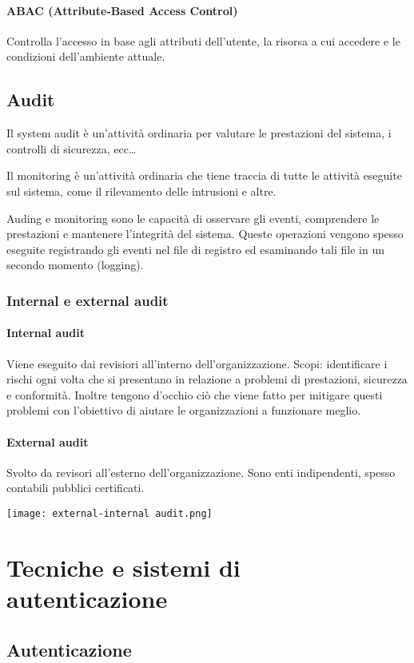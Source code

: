 \documentclass[11pt]{article}
\begin{document}
\paragraph*{ABAC (Attribute-Based Access Control)}
Controlla l'accesso in base agli attributi dell'utente, la risorsa a cui accedere e le condizioni dell'ambiente attuale.
\subsection{Audit}
Il system audit è un'attività ordinaria per valutare le prestazioni del sistema, i controlli di sicurezza, ecc\dots 

Il monitoring è un'attività ordinaria che tiene traccia di tutte le attività eseguite sul sistema, come il rilevamento delle 
intrusioni e altre.

Auding e monitoring sono le capacità di osservare gli eventi, comprendere le prestazioni e mantenere l'integrità del sistema.
Queste operazioni vengono spesso eseguite registrando gli eventi nel file di registro ed esaminando tali file in un secondo 
momento (logging).
\subsubsection{Internal e external audit}
\paragraph*{Internal audit}
Viene eseguito dai revisiori all'interno dell'organizzazione. Scopi: identificare i rischi ogni volta che si presentano 
in relazione a problemi di prestazioni, sicurezza e conformità. Inoltre tengono d'occhio ciò che viene fatto per mitigare 
questi problemi con l'obiettivo di aiutare le organizzazioni a funzionare meglio.
\paragraph*{External audit}
Svolto da revisori all'esterno dell'organizzazione. Sono enti indipendenti, spesso contabili pubblici certificati.
\begin{center}
    \texttt{[image: external-internal audit.png]}
\end{center}
\section{Tecniche e sistemi di autenticazione}
\subsection{Autenticazione}
\end{document}

